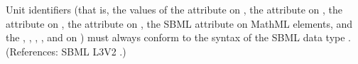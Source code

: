 Unit identifiers (that is, the values of the  attribute on
\UnitDefinition, the  attribute on \Compartment, the
 attribute on \Parameter,  the  attribute
on \Species, the SBML  attribute on MathML 
elements, and the , ,
, ,  and
 on \Model) must always conform to the syntax of the
SBML data type .  (References: SBML L3V2
.)
